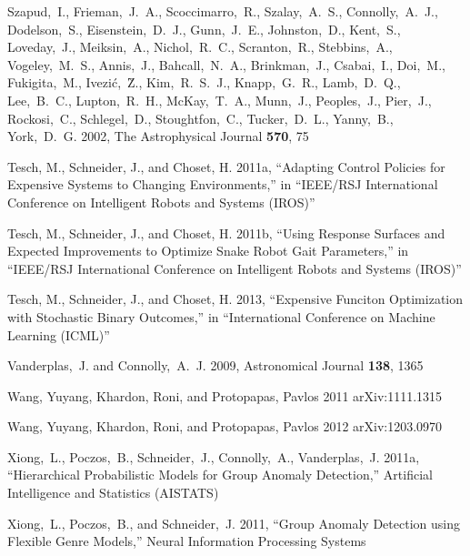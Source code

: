 \documentclass[prd,nofootbib,floatfix,11pt,tightenlines]{revtex4}
\begin{document}
\begin{thebibliography}{99}
Szapud,~I., Frieman,~J.~A., Scoccimarro,~R., Szalay,~A.~S., Connolly,~A.~J.,
Dodelson,~S., Eisenstein,~D.~J., Gunn,~J.~E., Johnston,~D., Kent,~S.,
Loveday,~J., Meiksin,~A., Nichol,~R.~C., Scranton,~R., Stebbins,~A.,
Vogeley,~M.~S., Annis,~J., Bahcall,~N.~A., Brinkman,~J., Csabai,~I., Doi,~M.,
Fukigita,~M., Ivezi\'c,~\u Z., Kim,~R.~S.~J., Knapp,~G.~R., Lamb,~D.~Q.,
Lee,~B.~C., Lupton,~R.~H., McKay,~T.~A., Munn,~J., Peoples,~J., Pier,~J.,
Rockosi,~C., Schlegel,~D., Stoughtfon,~C., Tucker,~D.~L., Yanny,~B., York,~D.~G.
2002, The Astrophysical Journal {\bf 570}, 75

Tesch, M., Schneider, J., and Choset, H. 2011a,
``Adapting Control Policies for Expensive Systems to Changing Environments,'' in
``IEEE/RSJ International Conference on Intelligent Robots and Systems (IROS)''

Tesch, M., Schneider, J., and Choset, H. 2011b,
``Using Response Surfaces and Expected Improvements to Optimize 
Snake Robot Gait Parameters,''
in
``IEEE/RSJ International Conference on Intelligent Robots and Systems (IROS)''

Tesch, M., Schneider, J., and Choset, H. 2013,
``Expensive Funciton Optimization with Stochastic Binary Outcomes,''
in ``International Conference on Machine Learning (ICML)''

Vanderplas,~J. and Connolly,~A.~J. 2009,
Astronomical Journal {\bf 138}, 1365

Wang, Yuyang, Khardon, Roni, and Protopapas, Pavlos 2011
arXiv:1111.1315

Wang, Yuyang, Khardon, Roni, and Protopapas, Pavlos 2012
arXiv:1203.0970


Xiong,~L., Poczos,~B., Schneider,~J., Connolly,~A., Vanderplas,~J. 2011a,
``Hierarchical Probabilistic Models for Group Anomaly Detection,''
Artificial Intelligence and Statistics (AISTATS)

Xiong,~L., Poczos,~B., and Schneider,~J. 2011, ``Group Anomaly Detection using Flexible
Genre Models,'' Neural Information Processing Systems


\end{thebibliography}
\end{document}
